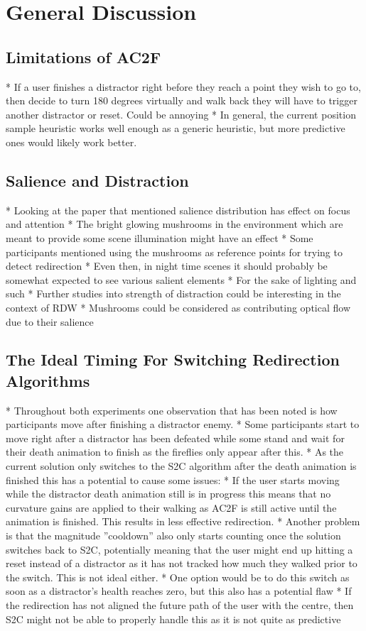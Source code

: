 \chapter{General Discussion}
\label{chap:discussion}

\section{Limitations of AC2F}
* If a user finishes a distractor right before they reach a point they wish to go to, then decide to turn 180 degrees virtually and walk back they will have to trigger another distractor or reset. Could be annoying
   * In general, the current position sample heuristic works well enough as a generic heuristic, but more predictive ones would likely work better. 
   
\section{Salience and Distraction}
* Looking at the paper that mentioned salience distribution has effect on focus and attention
   * The bright glowing mushrooms in the environment which are meant to provide some scene illumination might have an effect 
   * Some participants mentioned using the mushrooms as reference points for trying to detect redirection
   * Even then, in night time scenes it should probably be somewhat expected to see various salient elements
      * For the sake of lighting and such
   * Further studies into strength of distraction could be interesting in the context of RDW
   * Mushrooms could be considered as contributing optical flow due to their salience

\section{The Ideal Timing For Switching Redirection Algorithms}
* Throughout both experiments one observation that has been noted is how participants move after finishing a distractor enemy.
* Some participants start to move right after a distractor has been defeated while some stand and wait for their death animation to finish as the fireflies only appear after this. 
* As the current solution only switches to the S2C algorithm after the death animation is finished this has a potential to cause some issues:
   * If the user starts moving while the distractor death animation still is in progress this means that no curvature gains are applied to their walking as AC2F is still active until the animation is finished. This results in less effective redirection.
   * Another problem is that the magnitude ''cooldown'' also only starts counting once the solution switches back to S2C, potentially meaning that the user might end up hitting a reset instead of a distractor as it has not tracked how much they walked prior to the switch. This is not ideal either.
* One option would be to do this switch as soon as a distractor's health reaches zero, but this also has a potential flaw
   * If the redirection has not aligned the future path of the user with the centre, then S2C might not be able to properly handle this as it is not quite as predictive

